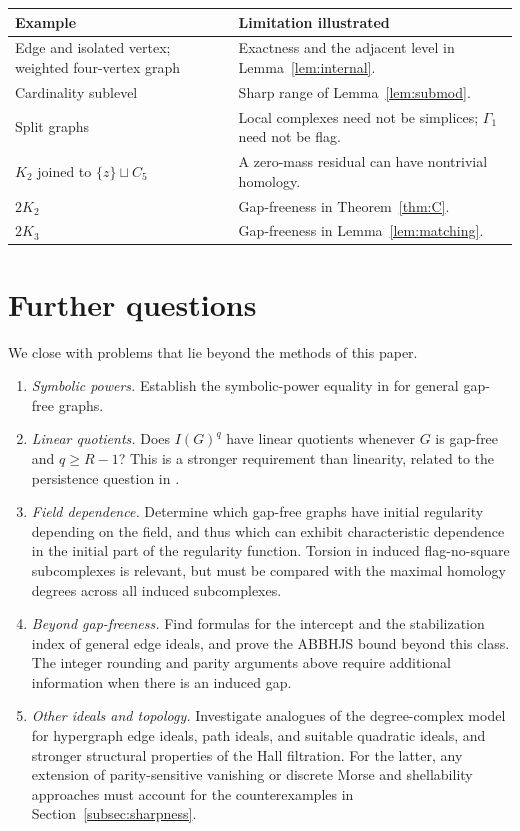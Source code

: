 \documentclass[11pt,a4paper]{article}
\theoremstyle{definition}
\begin{document}
\begin{center}
\small
\begin{tabularx}{\linewidth}{@{}p{.36\linewidth}X@{}}
\toprule
Example & Limitation illustrated\\
\midrule
Edge and isolated vertex; weighted four-vertex graph & Exactness and the adjacent level in Lemma~\ref{lem:internal}.\\
Cardinality sublevel & Sharp range of Lemma~\ref{lem:submod}.\\
Split graphs & Local complexes need not be simplices; $\Gamma_1$ need not be flag.\\
$K_2$ joined to $\{z\}\sqcup C_5$ & A zero-mass residual can have nontrivial homology.\\
$2K_2$ & Gap-freeness in Theorem~\ref{thm:C}.\\
$2K_3$ & Gap-freeness in Lemma~\ref{lem:matching}.\\
\bottomrule
\end{tabularx}
\end{center}

\section{Further questions}\label{sec:open}
We close with problems that lie beyond the methods of this paper.
\begin{enumerate}
\item \emph{Symbolic powers.} Establish the symbolic-power equality in \cite[Conjecture A]{MV} for general gap-free graphs.
\item \emph{Linear quotients.} Does $I(G)^q$ have linear quotients whenever $G$ is gap-free and $q\geq R-1$? This is a stronger requirement than linearity, related to the persistence question in \cite{E26}.
\item \emph{Field dependence.} Determine which gap-free graphs have initial regularity depending on the field, and thus which can exhibit characteristic dependence in the initial part of the regularity function. Torsion in induced flag-no-square subcomplexes is relevant, but must be compared with the maximal homology degrees across all induced subcomplexes.
\item \emph{Beyond gap-freeness.} Find formulas for the intercept and the stabilization index of general edge ideals, and prove the ABBHJS bound beyond this class. The integer rounding and parity arguments above require additional information when there is an induced gap.
\item \emph{Other ideals and topology.} Investigate analogues of the degree-complex model for hypergraph edge ideals, path ideals, and suitable quadratic ideals, and stronger structural properties of the Hall filtration. For the latter, any extension of parity-sensitive vanishing or discrete Morse and shellability approaches must account for the counterexamples in Section~\ref{subsec:sharpness}.
\end{enumerate}
\end{document}
